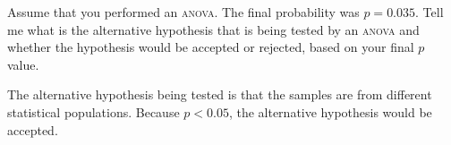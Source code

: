 \question[5]
Assume that you performed an \textsc{anova}. The final probability was $p = 0.035$. Tell me what is the alternative hypothesis that is being tested by an \textsc{anova} and whether the hypothesis would be accepted or rejected, based on your final $p$ value.

\begin{solution}

The alternative hypothesis being tested is that the samples are from different statistical populations. Because $p<0.05$, the alternative hypothesis would be accepted.

\end{solution}